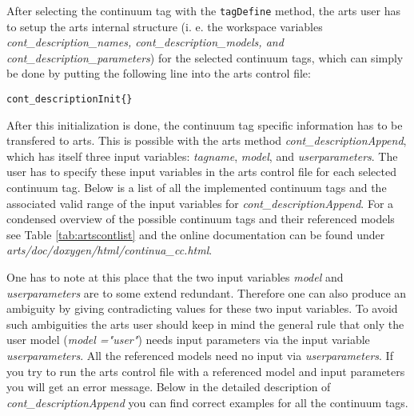 After selecting the continuum tag with the {\tt tagDefine} method, 
the arts user has to setup the arts internal structure (i. e. the workspace 
variables {\it cont\_description\_names, cont\_description\_models, 
and cont\_description\_parameters}) for the selected continuum tags, 
which can simply be done by putting the following line into the 
arts control file:
\begin{verbatim}
cont_descriptionInit{}
\end{verbatim}

After this initialization is done, the continuum tag specific
information has to be transfered to arts. This is possible with the 
arts method {\it cont\_descriptionAppend}, which has itself 
three input variables: {\it tagname}, {\it model}, and 
{\it userparameters}. The user has to specify these input 
variables in the arts control file for each selected continuum tag. 
Below is a list of all the implemented continuum tags and the associated
valid range of the input variables for {\it cont\_descriptionAppend}. 
For a condensed overview of the possible continuum tags and their 
referenced models see Table \ref{tab:artscontlist} and the 
online documentation can be found under {\it arts/doc/doxygen/html/continua\_cc.html}.

One has to note at this place that the two input variables {\it model} and
{\it userparameters} are to some extend redundant. Therefore one can also 
produce an ambiguity by giving contradicting values for these two input variables.
To avoid such ambiguities the arts user should keep in mind the general 
rule that only the user model ({\it model ="user"}) needs input parameters 
via the input variable {\it userparameters}. All the referenced models 
need no input via {\it userparameters}. If you try to run the arts control 
file with a referenced model and input parameters you will get an error message.
Below in the detailed description of {\it cont\_descriptionAppend} you 
can find correct examples for all the continuum tags.
 
